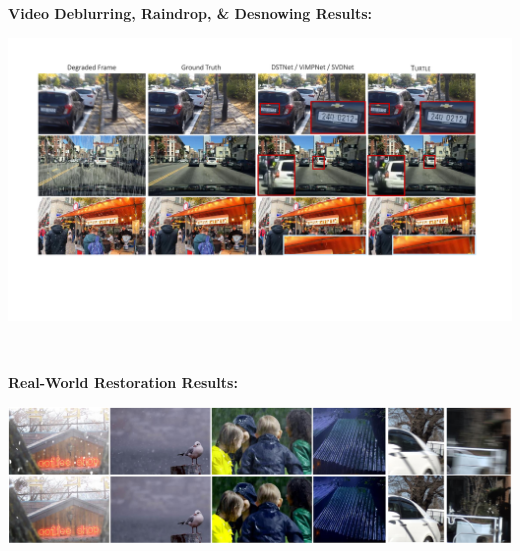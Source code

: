 \documentclass[landscape,paperwidth=48in,paperheight=36in,fontscale=0.3]{baposter}
\begin{document}
\begin{poster}
{\begin{minipage}[t]{.7\linewidth}
\begin{minipage}{\linewidth}
\vspace{0.5em}
\textbf{\color{blue}Video Deblurring, Raindrop, \& Desnowing Results:}
\vspace{0.5em}
\end{minipage}
\begin{minipage}{0.99\linewidth}
    \begin{minipage}{\linewidth}
    \centering
    \includegraphics[width=.99\linewidth]{new_imgs/main_fig_01.pdf}
    \end{minipage}
\end{minipage}
\\
\begin{minipage}{\linewidth}
\vspace{0.5em}
\textbf{\color{blue}Real-World Restoration Results:}
\vspace{0.5em}
\end{minipage}
\begin{minipage}{0.99\linewidth}
    \begin{minipage}{\linewidth}
    \centering
    \includegraphics[width=.99\linewidth]{new_imgs/main_fig_02.pdf}
    \end{minipage}
\end{minipage}
\end{minipage}
\begin{minipage}[t]{.24\linewidth}

\end{minipage}}
\end{poster}
\end{document}
